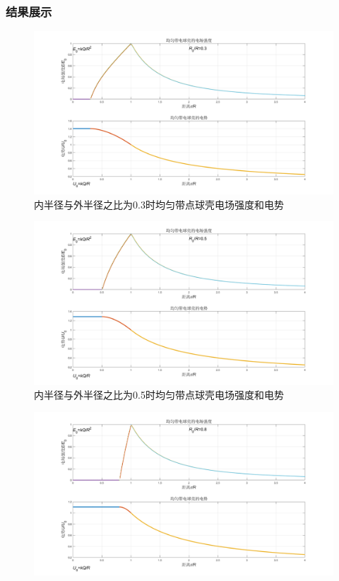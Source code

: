 \documentclass[UTF8]{article}
\numberwithin{figure}{subsection}
\numberwithin{table}{subsection}
\begin{document}
\begin{multicols}{2}
	\subsubsection{结果展示}
	\begin{figure}[H]
		\centering
		\includegraphics[scale=0.15]{0.3.png}
		\caption{内半径与外半径之比为0.3时均匀带点球壳电场强度和电势}
	\end{figure}
	\begin{figure}[H]
		\centering
		\includegraphics[scale=0.15]{0.5.png}
		\caption{内半径与外半径之比为0.5时均匀带点球壳电场强度和电势}
	\end{figure}
	\begin{figure}[H]
		\centering
		\includegraphics[scale=0.15]{0.8.png}

\end{figure}
\end{multicols}
\end{document}
